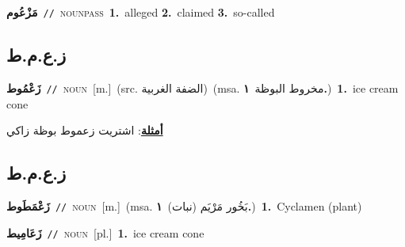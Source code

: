 \documentclass[10pt,a4paper,twoside]{article} %
\begin{document}
\begin{multicols}{2}
{\setlength\topsep{0pt}\textbf{\foreignlanguage{arabic}{مَزْعُوم}}\ {\color{gray}\texttt{//}\color{black}}\ \textsc{noun\textunderscore pass}\ \textbf{1.}~alleged  \textbf{2.}~claimed  \textbf{3.}~so-called\ } \vspace{2mm}

\vspace{-3mm}
\subsection*{\color{blue}\foreignlanguage{arabic}{ز.ع.م.ط}\color{blue}{}} 

{\setlength\topsep{0pt}\textbf{\foreignlanguage{arabic}{زَعْمُوط}}\ {\color{gray}\texttt{//}\color{black}}\ \textsc{noun}\ [m.]\ (src. \color{gray}\foreignlanguage{arabic}{الضفة الغربية}\color{black})\ \color{gray}(msa. \foreignlanguage{arabic}{مخروط البوظة}~\foreignlanguage{arabic}{\textbf{١.}})\color{black}\ \textbf{1.}~ice cream cone\  \begin{flushright}\color{gray}\foreignlanguage{arabic}{\textbf{\underline{\foreignlanguage{arabic}{أمثلة}}}: اشتريت زعموط بوظة زاكي}\end{flushright}\color{black}} \vspace{2mm}

\vspace{-3mm}
\subsection*{\color{blue}\foreignlanguage{arabic}{ز.ع.م.ط}\color{blue}{ (ntws)}} 

{\setlength\topsep{0pt}\textbf{\foreignlanguage{arabic}{زَعْمَطَوط}}\ {\color{gray}\texttt{//}\color{black}}\ \textsc{noun}\ [m.]\ \color{gray}(msa. \foreignlanguage{arabic}{بَخُور مَرْيَم (نبات)}~\foreignlanguage{arabic}{\textbf{١.}})\color{black}\ \textbf{1.}~Cyclamen (plant)\ } \vspace{2mm}

{\setlength\topsep{0pt}\textbf{\foreignlanguage{arabic}{زَعَامِيط}}\ {\color{gray}\texttt{//}\color{black}}\ \textsc{noun}\ [pl.]\ \textbf{1.}~ice cream cone\ } \vspace{2mm}


\end{multicols}
\end{document}
